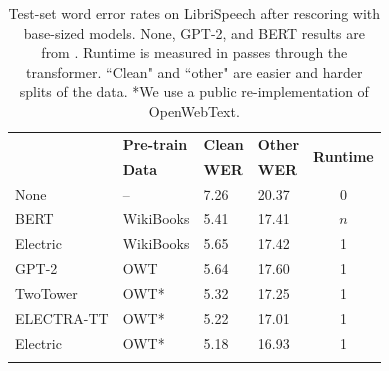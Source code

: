\documentclass[11pt,a4paper]{article}
\newcommand\tstrut{\rule{0pt}{2.6ex}}
\newcommand\bstrut{\rule[-1.0ex]{0pt}{0pt}}
\newcommand{\thinline}{\Xhline{1.5\arrayrulewidth}}
\newcommand{\thickline}{\Xhline{2.5\arrayrulewidth}}
\newcommand{\tsep}	{\bstrut \\ \thinline}
\newcommand{\ttop}{\thickline}
\newcommand{\tbottom}{\bstrut \\ \thickline}
\begin{document}
\renewcommand{\arraystretch}{1.1}
\addtolength{\tabcolsep}{-2.2pt}
\begin{table}[tb]
\small
\begin{center}
\begin{tabularx}{1.0\linewidth}{X l l l c}
\ttop 
\multirow{2}{*}{\textbf{Model}} & \textbf{Pre-train} & \textbf{Clean} & \textbf{Other} & \multirow{2}{*}{\textbf{Runtime}} \tstrut \\
 & \textbf{Data} & \textbf{WER} & \textbf{WER} &  \tsep
  None & -- & 7.26 & 20.37  & 0\tstrut \tsep
  BERT  & WikiBooks & 5.41 & 17.41 & $n$\tstrut\\
  Electric  & WikiBooks & 5.65 & 17.42 & 1\tsep
  GPT-2  & OWT & 5.64 & 17.60  & 1\tstrut\\
    TwoTower & OWT*  & 5.32 & 17.25 & 1\\
   ELECTRA-TT & OWT*  & 5.22 & 17.01 & 1\\
  Electric & OWT* & 5.18 & 16.93 &  1\tbottom
\end{tabularx} 
\end{center}
\caption{
Test-set word error rates on LibriSpeech after rescoring with base-sized models. None, GPT-2, and BERT results are from \citet{Salazar2019MaskedLM}.
Runtime is measured in passes through the transformer.
``Clean" and ``other" are easier and harder splits of the data. *We use a public re-implementation of OpenWebText. 
}
\vspace{-1mm}
\label{tab:pseudo}
\end{table}
\addtolength{\tabcolsep}{2.2pt}
\renewcommand{\arraystretch}{1.0}
\end{document}
